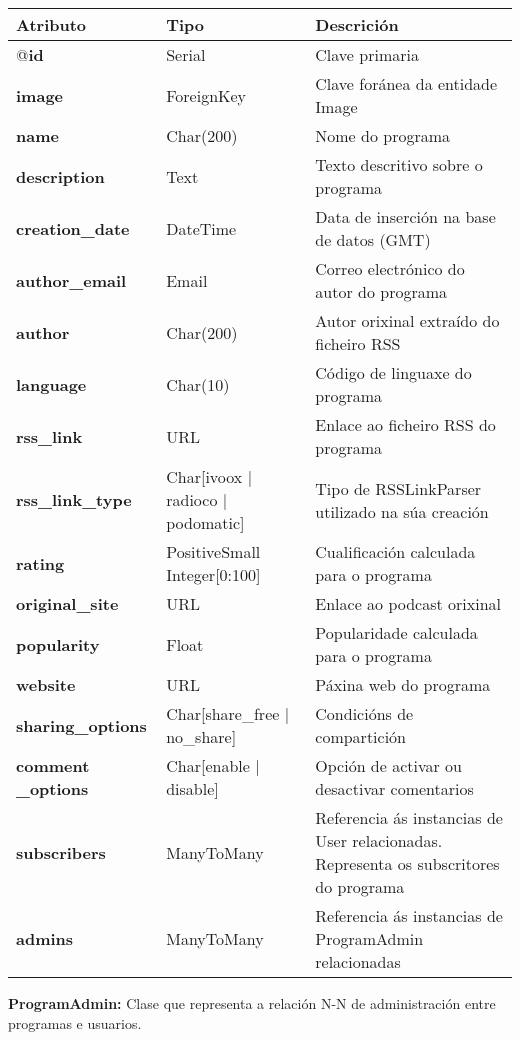 \begin{longtable}{|p{3cm}|p{3cm}|p{8cm}|}
	\hline
	\rowcolor{gray!50}
	Atributo & Tipo & Descrición\\
	\hline
	@\textbf{id} & Serial & Clave primaria\\
	\hline
	\textbf{image} & ForeignKey & Clave foránea da entidade Image\\
	\hline
	\textbf{name} & Char(200) & Nome do programa\\	
	\hline
	\textbf{description} & Text & Texto descritivo sobre o programa\\
	\hline
	\textbf{creation\_date} & DateTime & Data de inserción na base de datos (GMT)\\
	\hline
	\textbf{author\_email} & Email & Correo electrónico do autor do programa\\
	\hline
	\textbf{author} & Char(200) & Autor orixinal extraído do ficheiro RSS\\
	\hline
	\textbf{language} & Char(10) & Código de linguaxe do programa\\
	\hline
	\textbf{rss\_link} & URL & Enlace ao ficheiro RSS do programa\\
	\hline
	\textbf{rss\_link\_type} & Char[ivoox $|$ radioco $|$ podomatic] & Tipo de RSSLinkParser utilizado na súa creación\\
	\hline
	\textbf{rating} & PositiveSmall Integer[0:100] & Cualificación calculada para o programa\\
	\hline
	\textbf{original\_site} & URL & Enlace ao podcast orixinal\\
	\hline
	\textbf{popularity } & Float & Popularidade calculada para o programa\\
	\hline
	\textbf{website} & URL & Páxina web do programa\\
	\hline
	\textbf{sharing\_options} & Char[share\_free $|$ no\_share] & Condicións de compartición\\
	\hline
	\textbf{comment \_options} & Char[enable $|$ disable] & Opción de activar ou desactivar comentarios\\
	\hline
	\textbf{subscribers} &  ManyToMany & Referencia ás instancias de User relacionadas. Representa os subscritores do programa\\
	\hline
	\textbf{admins} &  ManyToMany & Referencia ás instancias de ProgramAdmin relacionadas\\
	\hline
\end{longtable}


\textbf{ProgramAdmin:} Clase que representa a relación N-N de administración entre programas e usuarios.

